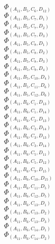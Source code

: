\documentclass[14pt]{article}
\begin{document}
    $\Phi_{({A}_{11}, {B}_{5}, {C}_{6}, {D}_{12})}$ \\ 
    $\Phi_{({A}_{11}, {B}_{5}, {C}_{7}, {D}_{1})}$ \\ 
    $\Phi_{({A}_{11}, {B}_{5}, {C}_{7}, {D}_{2})}$ \\ 
    $\Phi_{({A}_{11}, {B}_{5}, {C}_{7}, {D}_{3})}$ \\ 
    $\Phi_{({A}_{11}, {B}_{5}, {C}_{8}, {D}_{1})}$ \\ 
    $\Phi_{({A}_{11}, {B}_{5}, {C}_{8}, {D}_{2})}$ \\ 
    $\Phi_{({A}_{11}, {B}_{5}, {C}_{8}, {D}_{3})}$ \\ 
    $\Phi_{({A}_{11}, {B}_{5}, {C}_{9}, {D}_{4})}$ \\ 
    $\Phi_{({A}_{11}, {B}_{5}, {C}_{10}, {D}_{4})}$ \\ 
    $\Phi_{({A}_{11}, {B}_{5}, {C}_{11}, {D}_{6})}$ \\ 
    $\Phi_{({A}_{11}, {B}_{5}, {C}_{12}, {D}_{6})}$ \\ 
    $\Phi_{({A}_{11}, {B}_{6}, {C}_{1}, {D}_{13})}$ \\ 
    $\Phi_{({A}_{11}, {B}_{6}, {C}_{1}, {D}_{14})}$ \\ 
    $\Phi_{({A}_{11}, {B}_{6}, {C}_{2}, {D}_{13})}$ \\ 
    $\Phi_{({A}_{11}, {B}_{6}, {C}_{2}, {D}_{14})}$ \\ 
    $\Phi_{({A}_{11}, {B}_{6}, {C}_{3}, {D}_{13})}$ \\ 
    $\Phi_{({A}_{11}, {B}_{6}, {C}_{3}, {D}_{14})}$ \\ 
    $\Phi_{({A}_{11}, {B}_{6}, {C}_{5}, {D}_{11})}$ \\ 
    $\Phi_{({A}_{11}, {B}_{6}, {C}_{5}, {D}_{12})}$ \\ 
    $\Phi_{({A}_{11}, {B}_{6}, {C}_{9}, {D}_{15})}$ \\ 
    $\Phi_{({A}_{11}, {B}_{6}, {C}_{10}, {D}_{15})}$ \\ 
    $\Phi_{({A}_{11}, {B}_{6}, {C}_{11}, {D}_{5})}$ \\ 
    $\Phi_{({A}_{11}, {B}_{6}, {C}_{12}, {D}_{5})}$ \\ 
    $\Phi_{({A}_{11}, {B}_{6}, {C}_{13}, {D}_{1})}$ \\ 
    $\Phi_{({A}_{11}, {B}_{6}, {C}_{13}, {D}_{2})}$ \\ 
    $\Phi_{({A}_{11}, {B}_{6}, {C}_{13}, {D}_{3})}$ \\ 
    $\Phi_{({A}_{11}, {B}_{6}, {C}_{14}, {D}_{1})}$ \\ 
    $\Phi_{({A}_{11}, {B}_{6}, {C}_{14}, {D}_{2})}$ \\ 
\end{document}
